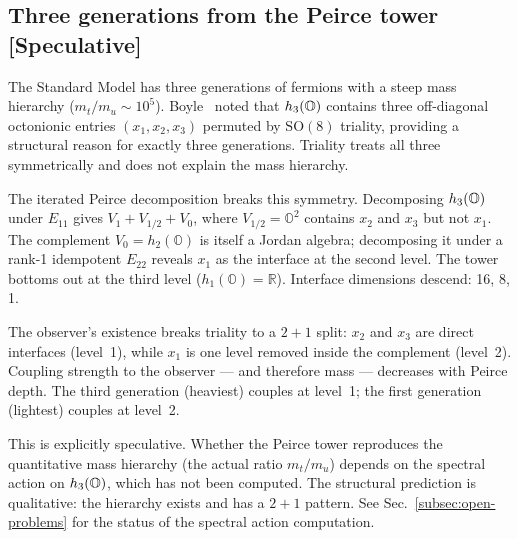 \subsection{Three generations from the Peirce tower [Speculative]}
\label{subsec:peirce-tower}

The Standard Model has three generations of fermions with a steep mass
hierarchy ($m_t / m_u \sim 10^5$).  Boyle~\citep{boyle2020} noted
that $h_3(\mathbb{O})$ contains three off-diagonal octonionic entries
$(x_1, x_2, x_3)$ permuted by $\mathrm{SO}(8)$ triality, providing a
structural reason for exactly three generations.  Triality treats all
three symmetrically and does not explain the mass hierarchy.

The iterated Peirce decomposition breaks this symmetry.  Decomposing
$h_3(\mathbb{O})$ under $E_{11}$ gives $V_1 + V_{1/2} + V_0$, where
$V_{1/2} = \mathbb{O}^2$ contains $x_2$ and $x_3$ but not $x_1$.
The complement $V_0 = h_2(\mathbb{O})$ is itself a Jordan algebra;
decomposing it under a rank-1 idempotent $E_{22}$ reveals $x_1$ as
the interface at the second level.  The tower bottoms out at the
third level ($h_1(\mathbb{O}) = \mathbb{R}$).  Interface dimensions
descend: 16, 8, 1.

The observer's existence breaks triality to a $2+1$ split: $x_2$ and
$x_3$ are direct interfaces (level~1), while $x_1$ is one level
removed inside the complement (level~2).  Coupling strength to the
observer --- and therefore mass --- decreases with Peirce depth.  The
third generation (heaviest) couples at level~1; the first generation
(lightest) couples at level~2.

\begin{remark}
This is explicitly speculative.  Whether the Peirce tower reproduces
the quantitative mass hierarchy (the actual ratio $m_t / m_u$)
depends on the spectral action on $h_3(\mathbb{O})$, which has not been
computed.  The structural prediction is qualitative: the hierarchy
exists and has a $2+1$ pattern.  See Sec.~\ref{subsec:open-problems}
for the status of the spectral action computation.
\end{remark}

